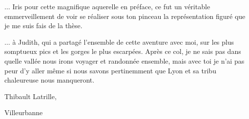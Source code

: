$\hdots$ Iris pour cette magnifique aquerelle en préface, ce fut un véritable emmerveillement de voir se réaliser sous ton pinceau la représentation figuré que je me suis fais de la thèse.

$\hdots$ à Judith, qui a partagé l’ensemble de cette aventure avec moi, sur les plus somptueux pics et les gorges le plus escarpées.
Après ce col, je ne sais pas dans quelle vallée nous irons voyager et randonnée ensemble, mais avec toi je n’ai pas peur d’y aller même si nous savons pertinemment que Lyon et sa tribu chaleureuse nous manqueront.

\begin{flushright}
	Thibault Latrille,
	
	Villeurbanne
\end{flushright}
